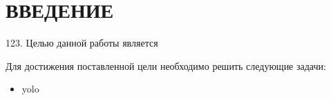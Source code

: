 \section*{ВВЕДЕНИЕ}

123. Целью данной работы является 

Для достижения поставленной цели необходимо решить следующие задачи:

\begin{itemize}
	\item yolo
\end{itemize}

\pagebreak
